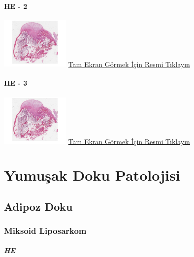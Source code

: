 \documentclass[
  letterpaper,
  DIV=11,
  numbers=noendperiod]{scrreprt}
\begin{document}
\hypertarget{he---2-4}{%
\subsection{HE - 2}\label{he---2-4}}

\href{https://images.patolojiatlasi.com/exostosis/HE.html}{\includegraphics[width=0.25\textwidth,height=\textheight]{./screenshots/exostosis-2_screenshot.png}}
\href{https://images.patolojiatlasi.com/exostosis/oc001.html}{Tam Ekran
Görmek İçin Resmi Tıklayın}

\hypertarget{he---3-3}{%
\subsection{HE - 3}\label{he---3-3}}

\href{https://images.patolojiatlasi.com/exostosis/oc002.html}{\includegraphics[width=0.25\textwidth,height=\textheight]{./screenshots/exostosis-3_screenshot.png}}
\href{https://images.patolojiatlasi.com/exostosis/oc002.html}{Tam Ekran
Görmek İçin Resmi Tıklayın}

\part{Yumuşak Doku Patolojisi}

\hypertarget{sec-adipoz-doku}{%
\chapter{Adipoz Doku}\label{sec-adipoz-doku}}

\hypertarget{sec-miksoid-liposarkom}{%
\section{Miksoid Liposarkom}\label{sec-miksoid-liposarkom}}

\hypertarget{he-11}{%
\subsubsection{HE}\label{he-11}}
\end{document}
